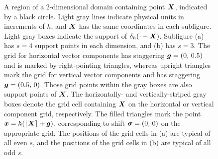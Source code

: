\begin{figure}[t]
    \caption{%
A region of a 2-dimensional domain containing point $\boldsymbol{X}$, indicated by a black
circle. Light gray lines indicate physical units in increments of $h$, and $\boldsymbol{X}$
has the same coordinates in each subfigure. Light gray boxes indicate the
support of $\delta_h(\cdot-\boldsymbol{X})$. Subfigure (a) has $s=4$ support points in each
dimension, and (b) has $s=3$. The grid for horizontal vector components has
staggering $\boldsymbol{g}=(0,\,0.5)$ and is marked by right-pointing triangles, whereas
upright triangles mark the grid for vertical vector components and has
staggering $\boldsymbol{g}=(0.5,\,0)$. Those grid points within the gray boxes are also
support points of $\boldsymbol{X}$. The horizontally- and vertically-striped gray boxes
denote the grid cell containing $\boldsymbol{X}$ on the horizontal or vertical component
grid, respectively. The filled triangles mark the point $\boldsymbol{x}=h(\left\lfloor{\boldsymbol{X}}\right\rceil+\boldsymbol{g})$,
corresponding to shift $\boldsymbol{\sigma}=(0,\,0)$ on the appropriate grid. The positions
of the grid cells in (a) are typical of all even $s$, and the positions of the
grid cells in (b) are typical of all odd $s$.
    }
    \label{fig:grid}
\end{figure}
